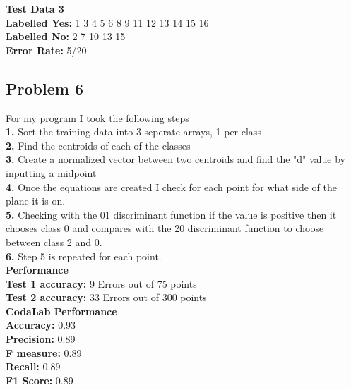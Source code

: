 \documentclass[letter]{article}
\theoremstyle{case}
\begin{document}
\textbf{Test Data 3} \\
\textbf{Labelled Yes: } 1 3 4 5 6 8 9 11 12 13 14 15 16\\
\textbf{Labelled No: } 2 7 10 13 15 \\
\textbf{Error Rate: } 5/20\\
\newpage
\subsection*{Problem 6}
For my program I took the following steps \\
\textbf{1.} Sort the training data into 3 seperate arrays, 1 per class \\
\textbf{2.} Find the centroids of each of the classes \\
\textbf{3.} Create a normalized vector between two centroids and find the "d" value by inputting a midpoint\\
\textbf{4.} Once the equations are created I check for each point for what side of the plane it is on.\\
\textbf{5.} Checking with the 01 discriminant function if the value is positive then it chooses class 0 and compares with the 20 discriminant function to choose between class 2 and 0.\\
\textbf{6.} Step 5 is repeated for each point.\\

\textbf{Performance} \\
\textbf{Test 1 accuracy: } 9 Errors out of 75 points\\
\textbf{Test 2 accuracy: } 33 Errors out of 300 points\\

\textbf{CodaLab Performance} \\
\textbf{Accuracy:}  0.93\\
\textbf{Precision:} 0.89 \\
\textbf{F measure:} 0.89 \\
\textbf{Recall:} 0.89 \\
\textbf{F1 Score:} 0.89\\
\end{document}
